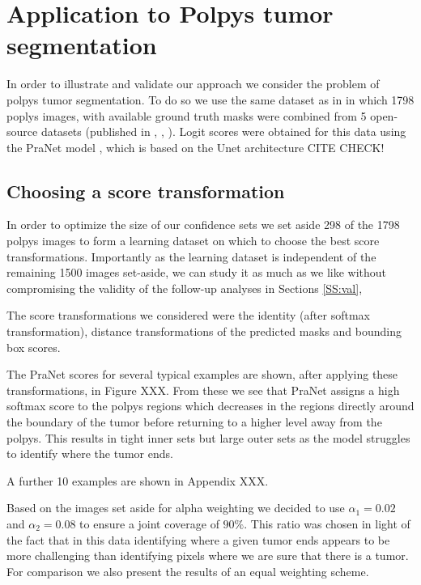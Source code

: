 \section{Application to Polpys tumor segmentation}
In order to illustrate and validate our approach we consider the problem of polpys tumor segmentation. To do so we use the same dataset as in \cite{Angelopoulos2022} in which 1798 poplys images, with available ground truth masks were combined from 5 open-source datasets (published in \cite{KVASIR2017}, \cite{Hyperkvasir2020} \cite{Bernal2012}, \cite{Silva2014}). Logit scores were obtained for this data using the PraNet model \cite{PraNet2020}, which is based on the Unet architecture CITE CHECK! 

\subsection{Choosing a score transformation}
In order to optimize the size of our confidence sets we set aside 298 of the 1798 polpys images to form a learning dataset on which to choose the best score transformations. Importantly as the learning dataset is independent of the remaining 1500 images set-aside, we can study it as much as we like without compromising the validity of the follow-up analyses in Sections \ref{SS:val}, 

The score transformations we considered were the identity (after softmax transformation), distance transformations of the predicted masks and bounding box scores. 


The PraNet scores for several typical examples are shown, after applying these transformations, in Figure XXX.  From these we see that PraNet assigns a high softmax score to the polpys regions which decreases in the regions directly around the  boundary of the tumor before returning to a higher level away from the polpys. This results in tight inner sets but large outer sets as the model struggles to identify where the tumor ends. 

A further 10 examples are shown in Appendix XXX. 

Based on the images set aside for alpha weighting we decided to use $\alpha_1 = 0.02$ and $\alpha_2 = 0.08$ to ensure a joint coverage of $90\%$. This ratio was chosen in light of the fact that in this data identifying where a given tumor ends appears to be more challenging than identifying pixels where we are sure that there is a tumor. For comparison we also present the results of an equal weighting scheme.


